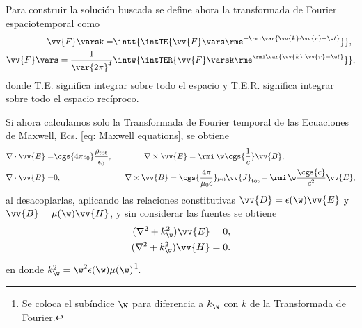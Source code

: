 \label{AppendixScalarPotentials}
Para construir la solución buscada se define ahora la transformada de Fourier espaciotemporal como
\begin{align}
\vv{F}\varsk = &\intt{\intTE{ \vv{F}\vars \rme^{-\rmi \var{\vv{k}\cdot\vv{r}-\w t}} }},\nonumber \\
\vv{F}\vars = \frac{1}{\var{2\pi}^4}&\intw{\intTER{ \vv{F}\varsk \rme^{\rmi\var{\vv{k}\cdot\vv{r}-\w t}} }},
\end{align}
donde T.E. significa integrar sobre todo el espacio y T.E.R. significa integrar sobre todo el espacio recíproco. 

Si ahora calculamos solo la Transformada de Fourier temporal de las Ecuaciones de Maxwell, Ecs. \eqref{eq: Maxwell equations}, se obtiene
\begin{align}
\nabla\cdot\vv{E} =& \cgs{4\pi\epsilon_0}\frac{\rho_{\text{tot}}}{\epsilon_0}, \qquad \qquad \nabla\times\vv{E}= \rmi \,\w\cgs{\frac{1}{c}}\vv{B}, \nonumber \\
\nabla\cdot\vv{B} =& 0, \qquad \qquad \qquad \qquad \nabla\times\vv{B}=\cgs{\frac{4\pi}{\mu_0 c}}\mu_0\vv{J}_{\text{tot}}- \rmi \, \w\frac{\cgs{c}}{c^2}\vv{E},
\label{eq: Maxwell equations freq}
\end{align}
al desacoplarlas, aplicando las relaciones constitutivas $\vv{D}=\epsilon(\w)\vv{E}$ y $\vv{B} = \mu(\w) \vv{H}$, y sin considerar las fuentes se obtiene
\begin{align*}
(\nabla^2 + k_{\w}^2)\vv{E} = 0, \\
(\nabla^2 + k_{\w}^2)\vv{H} = 0.
\end{align*}
en donde $k_{\w}^2=\w^2 \epsilon(\w) \mu(\w)$\footnote{Se coloca el subíndice $\w$ para diferencia a $k_\w$ con $k$ de la Transformada de Fourier.}.


